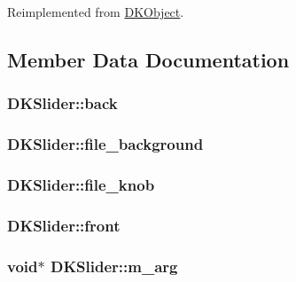 Reimplemented from \hyperlink{class_d_k_object_a3b7ce9102fdf1d8e3404d73e79be8901}{D\-K\-Object}.



\subsection{Member Data Documentation}
\hypertarget{class_d_k_slider_afe328a7c425bd2312b4c601e765d3a55}{
\subsubsection[{back}]{ D\-K\-Slider\-::back}}\label{class_d_k_slider_afe328a7c425bd2312b4c601e765d3a55}
\hypertarget{class_d_k_slider_a769c9131da89eb771d3b2e4a59a08c69}{
\subsubsection[{file\-\_\-background}]{ D\-K\-Slider\-::file\-\_\-background}}\label{class_d_k_slider_a769c9131da89eb771d3b2e4a59a08c69}
\hypertarget{class_d_k_slider_a1f7bcb1775e7f05cf94d6dad1abd1d0d}{
\subsubsection[{file\-\_\-knob}]{ D\-K\-Slider\-::file\-\_\-knob}}\label{class_d_k_slider_a1f7bcb1775e7f05cf94d6dad1abd1d0d}
\hypertarget{class_d_k_slider_a235aa3e8d55e7bfb9186ea5ba4d1bdd1}{
\subsubsection[{front}]{ D\-K\-Slider\-::front}}\label{class_d_k_slider_a235aa3e8d55e7bfb9186ea5ba4d1bdd1}
\hypertarget{class_d_k_slider_a2d1674560d5aae0080de48e546b02286}{
\subsubsection[{m\-\_\-arg}]{\setlength{\rightskip}{0pt plus 5cm}void$\ast$ D\-K\-Slider\-::m\-\_\-arg}}\label{class_d_k_slider_a2d1674560d5aae0080de48e546b02286}
